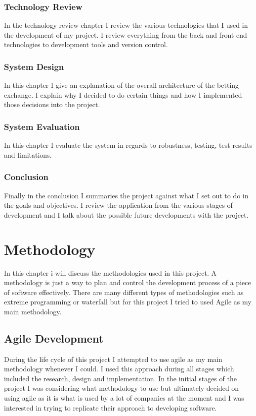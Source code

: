 \subsection{Technology Review}
In the technology review chapter I review the various technologies that I used in the development of my project. I review everything from the back and front end technologies to development tools and version control.

\subsection{System Design}
In this chapter I give an explanation of the overall architecture of the betting exchange. I explain why I decided to do certain things and how I implemented those decisions into the project.

\subsection{System Evaluation}
In this chapter I evaluate the system in regards to robustness, testing, test results and limitations. 

\subsection{Conclusion}
Finally in the conclusion I summaries the project against what I set out to do in the goals and objectives. I review the application from the various stages of development and I talk about the possible future developments with the project.

\chapter{Methodology}
In this chapter i will discuss the methodologies used in this project. A methodology is just a way to plan and control the development process of a piece of software effectively. There are many different types of methodologies such as extreme programming or waterfall but for this project I tried to used Agile as my main methodology.

\section{Agile Development}
During the life cycle of this project I attempted to use agile as my main methodology whenever I could. I used this approach during all stages which included the research, design and implementation. In the initial stages of the project I was considering what methodology to use but ultimately decided on using agile as it is what is used by a lot of companies at the moment and I was interested in trying to replicate their approach to developing software.

